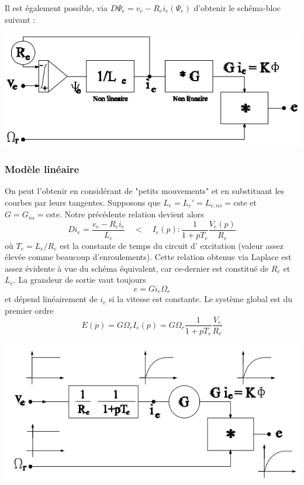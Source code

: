 		\newpage
		Il est également possible, via $D\Psi_e = v_e - R_ei_e(\Psi_e)$ 
		d'obtenir le schéma-bloc suivant :
		\begin{center}
		\includegraphics[scale=0.5]{ch4/image10.png}
		\end{center}			
		
		\subsubsection{Modèle linéaire}
		On peut l'obtenir en considérant de "petits mouvements" et en 
		substituant les courbes par leurs tangentes. Supposons que 
		$L_e = L_e' = L_{e,ns} = \text{cste}$ et $G = G_{ns} = 
		\text{cste}$. Notre précédente relation devient alors 
		\begin{equation}
		Di_e = \frac{v_e - R_ei_e}{L_e} \quad \lt\quad I_e(p) : 
		\frac{1}{1+pT_e}\frac{V_e(p)}{R_e}
		\end{equation}
		où $T_e = L_e/R_e$ est la constante de temps du circuit d'
		excitation (valeur assez élevée comme beaucoup d'enroulements). 
		Cette relation obtenue via Laplace est assez évidente à vue 
		du schéma équivalent, car ce-dernier est constitué de $R_e$ 
		et $L_e$. La grandeur de sortie vaut toujours 
		\begin{equation}
		e = Gi_e\Omega_r
		\end{equation}
		et dépend linéairement de $i_e$ si la vitesse est constante. 
		Le système global est du premier ordre
		\begin{equation}
		E(p) = G\Omega_r I_e(p) = G\Omega_r \dfrac{1}{1+pT_e}\frac{V_e
		}{R_e}
		\end{equation}
		\begin{center}
		\includegraphics[scale=0.5]{ch4/image11.png}
		\end{center}			
		
